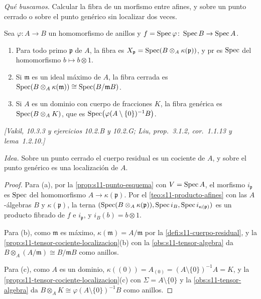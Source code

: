 \emph{Qué buscamos.} Calcular la fibra de un morfismo entre afines, y sobre un punto cerrado o sobre el punto genérico sin localizar dos veces.

\begin{prop}
\label{prop:s11-fibra-afines}
Sea \(\varphi\colon A\to B\) un homomorfismo de anillos y \(f=\operatorname{Spec}\varphi\colon\operatorname{Spec} B\to\operatorname{Spec} A\).
\begin{enumerate}[label=(\alph*)]
\item Para todo primo \(\mathfrak p\) de \(A\), la fibra es \(X_{\mathfrak p}=\operatorname{Spec}(B\otimes_A\kappa(\mathfrak p))\), y \(\mathrm{pr}\) es \(\operatorname{Spec}\) del homomorfismo \(b\mapsto b\otimes1\).
\item Si \(\mathfrak m\) es un ideal máximo de \(A\), la fibra cerrada es \(\operatorname{Spec}(B\otimes_A\kappa(\mathfrak m))\cong\operatorname{Spec}(B/\mathfrak mB)\).
\item Si \(A\) es un dominio con cuerpo de fracciones \(K\), la fibra genérica es \(\operatorname{Spec}(B\otimes_AK)\), que es \(\operatorname{Spec}\bigl(\varphi(A\setminus\{0\})^{-1}B\bigr)\).
\end{enumerate}
\emph{[Vakil, 10.3.3 y ejercicios 10.2.B y 10.2.G; Liu, prop.~3.1.2, cor.~1.1.13 y lema~1.2.10.]}
\end{prop}

\emph{Idea.} Sobre un punto cerrado el cuerpo residual es un cociente de \(A\), y sobre el punto genérico es una localización de \(A\).

\begin{proof}
Para (a), por la \cref{prop:s11-punto-esquema} con \(V=\operatorname{Spec} A\), el morfismo \(i_{\mathfrak p}\) es \(\operatorname{Spec}\) del homomorfismo \(A\to\kappa(\mathfrak p)\). Por el \cref{teo:s11-producto-afines} con las \(A\)-álgebras \(B\) y \(\kappa(\mathfrak p)\), la terna \((\operatorname{Spec}(B\otimes_A\kappa(\mathfrak p)),\operatorname{Spec} i_B,\operatorname{Spec} i_{\kappa(\mathfrak p)})\) es un producto fibrado de \(f\) e \(i_{\mathfrak p}\), y \(i_B(b)=b\otimes1\).

Para (b), como \(\mathfrak m\) es máximo, \(\kappa(\mathfrak m)=A/\mathfrak m\) por la \cref{defi:s11-cuerpo-residual}, y la \cref{prop:s11-tensor-cociente-localizacion}(b) con la \cref{obs:s11-tensor-algebra} da \(B\otimes_A(A/\mathfrak m)\cong B/\mathfrak mB\) como anillos.

Para (c), como \(A\) es un dominio, \(\kappa((0))=A_{(0)}=(A\setminus\{0\})^{-1}A=K\), y la \cref{prop:s11-tensor-cociente-localizacion}(c) con \(\Sigma=A\setminus\{0\}\) y la \cref{obs:s11-tensor-algebra} da \(B\otimes_AK\cong\varphi(A\setminus\{0\})^{-1}B\) como anillos.
\end{proof}

